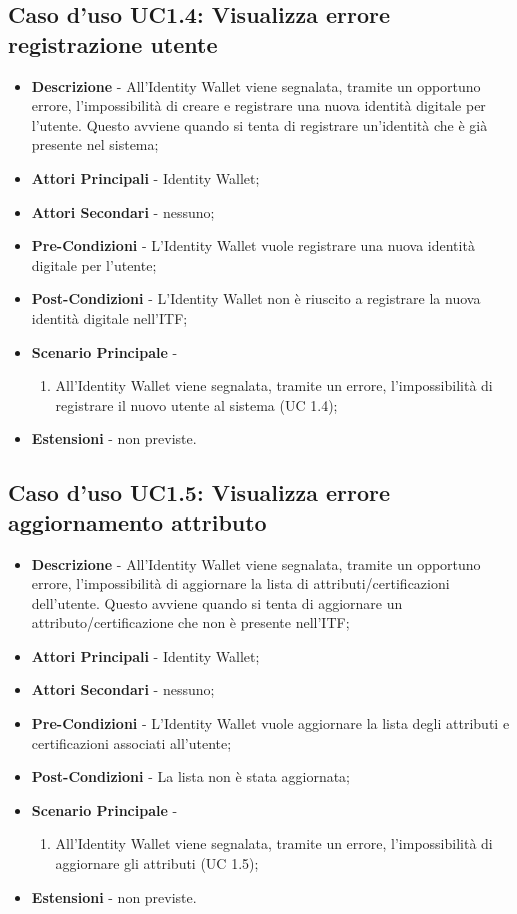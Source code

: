 \subsection{Caso d'uso UC1.4: Visualizza errore registrazione utente}
\begin{itemize}
	\item \textbf{Descrizione} - All'Identity Wallet viene segnalata, tramite un opportuno errore, l'impossibilità di creare e registrare una nuova identità digitale per l'utente. Questo avviene quando si tenta di registrare un'identità che è già presente nel sistema;
	\item \textbf{Attori Principali} - Identity Wallet;
	\item \textbf{Attori Secondari} - nessuno;
	\item \textbf{Pre-Condizioni} - L'Identity Wallet vuole registrare una nuova identità digitale per l'utente;
	\item \textbf{Post-Condizioni} - L'Identity Wallet non è riuscito a registrare la nuova identità digitale nell'\gls{ITF};
	\item \textbf{Scenario Principale} -
	\begin{enumerate}
		\item All'Identity Wallet viene segnalata, tramite un errore, l'impossibilità di registrare il nuovo utente al sistema (UC 1.4);
	\end{enumerate}
	\item \textbf{Estensioni} - non previste.
\end{itemize}
\subsection{Caso d'uso UC1.5: Visualizza errore aggiornamento attributo}
\begin{itemize}
	\item \textbf{Descrizione} - All'Identity Wallet viene segnalata, tramite un opportuno errore, l'impossibilità di aggiornare la lista di attributi/certificazioni dell'utente. Questo avviene quando si tenta di aggiornare un attributo/certificazione che non è presente nell'\gls{ITF};
	\item \textbf{Attori Principali} - Identity Wallet;
	\item \textbf{Attori Secondari} - nessuno;
	\item \textbf{Pre-Condizioni} - L'Identity Wallet vuole aggiornare la lista degli attributi e certificazioni associati all'utente;
	\item \textbf{Post-Condizioni} - La lista non è stata aggiornata;
	\item \textbf{Scenario Principale} -
	\begin{enumerate}
		\item All'Identity Wallet viene segnalata, tramite un errore, l'impossibilità di aggiornare gli attributi (UC 1.5);
	\end{enumerate}
	\item \textbf{Estensioni} - non previste.
\end{itemize}
\newpage
